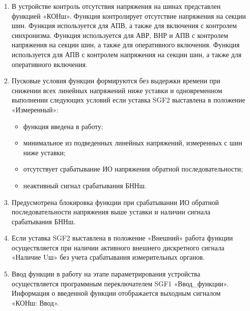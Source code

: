 
\color{black}

\begin{enumerate}

\item
В устройстве контроль отсутствия напряжения на шинах представлен функцией «КОНш». Функция контролирует отсутствие напряжения на секции шин. Функция используется для АПВ, а также для включения с контролем синхронизма. 
{
    Функция используется для АВР, ВНР и АПВ с контролем напряжения на секции шин, а также для оперативного включения.
}
{
    Функция используется для АПВ с контролем напряжения на секции шин, а также для оперативного включения.
}

\item
Пусковые условия функции формируются без выдержки времени при снижении всех линейных напряжений ниже уставки и одновременном выполнении следующих условий если уставка SGF2 выставлена в положение «Измеренный»:
\begin{itemize}
    \item функция введена в работу;
    \item минимальное из подведенных линейных напряжений, измеренных с шин ниже уставки;
    \item отсутствует срабатывание ИО напряжения обратной последовательности;
    \item неактивный сигнал срабатывания БННш.
\end{itemize}

\item
Предусмотрена блокировка функции при срабатывании ИО обратной последовательности напряжения выше уставки и наличии сигнала срабатывания БННш.

\item
Если уставка SGF2 выставлена в положение «Внешний» работа функции осуществляется при наличии активного внешнего дискретного сигнала «Наличие Uш» без учета срабатывания измерительных органов.

\item
Ввод функции в работу на этапе параметрирования устройства осуществляется программным переключателем SGF1 «Ввод\_функции». Информация о введенной функции отображается выходным сигналом «КОНш: Ввод».


\end{enumerate}

